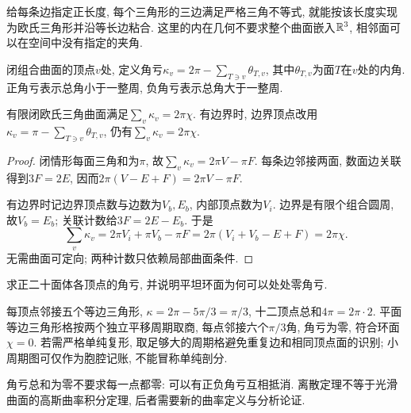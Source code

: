 给每条边指定正长度, 每个三角形的三边满足严格三角不等式, 就能按该长度实现为欧氏三角形并沿等长边粘合. 这里的内在几何不要求整个曲面嵌入$\mathbb R^3$, 相邻面可以在空间中没有指定的夹角.
\begin{definition}
闭组合曲面的顶点$v$处, 定义角亏$\kappa_v=2\pi-\sum_{T\ni v}\theta_{T,v}$, 其中$\theta_{T,v}$为面$T$在$v$处的内角. 正角亏表示总角小于一整周, 负角亏表示总角大于一整周.
\end{definition}
\begin{theorem}\label{thm:discrete-gauss-bonnet}
有限闭欧氏三角曲面满足$\sum_v\kappa_v=2\pi\chi$. 有边界时, 边界顶点改用$\kappa_v=\pi-\sum_{T\ni v}\theta_{T,v}$, 仍有$\sum_v\kappa_v=2\pi\chi$.
\end{theorem}
\begin{proof}
闭情形每面三角和为$\pi$, 故$\sum_v\kappa_v=2\pi V-\pi F$. 每条边邻接两面, 数面边关联得到$3F=2E$, 因而$2\pi(V-E+F)=2\pi V-\pi F$.

有边界时记边界顶点数与边数为$V_b,E_b$, 内部顶点数为$V_i$. 边界是有限个组合圆周, 故$V_b=E_b$; 关联计数给$3F=2E-E_b$. 于是
\[
 \sum_v\kappa_v=2\pi V_i+\pi V_b-\pi F
 =2\pi(V_i+V_b-E+F)=2\pi\chi.
\]
无需曲面可定向; 两种计数只依赖局部曲面条件.
\end{proof}

\begin{example}
求正二十面体各顶点的角亏, 并说明平坦环面为何可以处处零角亏.
\end{example}
\begin{solution}
每顶点邻接五个等边三角形, $\kappa=2\pi-5\pi/3=\pi/3$, 十二顶点总和$4\pi=2\pi\cdot2$. 平面等边三角形格按两个独立平移周期取商, 每点邻接六个$\pi/3$角, 角亏为零, 符合环面$\chi=0$. 若需严格单纯复形, 取足够大的周期格避免重复边和相同顶点面的识别; 小周期图可仅作为胞腔记账, 不能冒称单纯剖分.
\end{solution}
角亏总和为零不要求每一点都零: 可以有正负角亏互相抵消. 离散定理不等于光滑曲面的高斯曲率积分定理, 后者需要新的曲率定义与分析论证.

